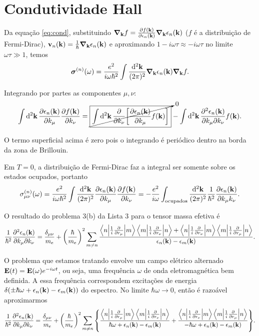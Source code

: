 \documentclass[a4paper,10pt]{article}
\begin{document}
\pagebreak

\section{Condutividade Hall}

Da equação \ref{eq:cond}, substituindo $\grad_{\vb{k}}f = \pdv{f(\vb{k})}{\epsilon_n(\vb{k})} \grad_{\vb{k}}\epsilon_n(\vb{k})$ ($f$ é a distribuição de Fermi-Dirac), $\vb{v}_n(\vb{k}) = \frac{1}{\hbar} \grad_{\vb{k}}\epsilon_n(\vb{k})$ e aproximando $1-i\omega\tau \approx -i\omega\tau$ no limite $\omega\tau \gg 1$, temos
$$
\bm{\sigma}^{(n)}(\omega) = \frac{e^2}{i\omega \hbar^2}
\int \frac{\dd[2]{\vb{k}}}{(2\pi)^2} \grad_{\vb{k}}\epsilon_n(\vb{k}) \grad_{\vb{k}} f.
$$

 Integrando por partes as componentes $\mu, \nu$:
$$
\int \dd[2]{\vb{k}} \pdv{\epsilon_n(\vb{k})}{k_\mu} \pdv{f(\vb{k})}{k_\nu} =
\cancelto{0}{\boxed{\int \dd[2]{\vb{k}} \pdv{k_\nu} \qty[\pdv{\epsilon_n(\vb{k})}{k_\mu} f(\vb{k})]}} -
\int \dd[2]{\vb{k}} \pdv{\epsilon_n(\vb{k})}{k_\mu}{k_\nu} f(\vb{k}).
$$

O termo superficial acima é zero pois o integrando é periódico dentro na borda da zona de Brillouin.

Em $T=0$, a distribuição de Fermi-Dirac faz a integral ser somente sobre os estados ocupados, portanto
$$
\sigma^{(n)}_{\mu\nu}(\omega) = \frac{e^2}{i\omega \hbar^2}
\int \frac{\dd[2]{\vb{k}}}{(2\pi)^2} \pdv{\epsilon_n(\vb{k})}{k_\mu} \pdv{f(\vb{k})}{k_\nu} =
- \frac{e^2}{i\omega}
\int_{\text{ocupados}} \frac{\dd[2]{\vb{k}}}{(2\pi)^2} \frac{1}{\hbar^2} \pdv{\epsilon_n(\vb{k})}{k_\mu k_\nu}.
$$

O resultado do problema 3(b) da Lista 3 para o tensor massa efetiva é
$$
\frac{1}{\hbar^2} \pdv{\epsilon_n(\vb{k})}{k_\mu}{k_\nu} =
\frac{\delta_{\mu\nu}}{m_e} +
\qty(\frac{\hbar}{m_e})^2
\sum_{m\neq n}
\frac{
\mel**{n}{\frac{1}{i}\pdv{r_\mu}}{m} \mel**{m}{\frac{1}{i}\pdv{r_\nu}}{n} +
\mel**{n}{\frac{1}{i}\pdv{r_\nu}}{m} \mel**{m}{\frac{1}{i}\pdv{r_\mu}}{n}
}{\epsilon_n(\vb{k}) - \epsilon_{m}(\vb{k})}.
$$

O problema que estamos tratando envolve um campo elétrico alternado $\vb{E}(t) = \vb{E}(\omega) e^{-i\omega t}$, ou seja, uma frequência $\omega$ de onda eletromagnética bem definida. A essa frequência correspondem excitações de energia $\delta(\pm \hbar \omega + \epsilon_n(\vb{k}) - \epsilon_m(\vb{k}))$ do espectro. No limite $\hbar \omega \to 0$, então é razoável aproximarmos
$$
\frac{1}{\hbar^2} \pdv{\epsilon_n(\vb{k})}{k_\mu}{k_\nu} =
\frac{\delta_{\mu\nu}}{m_e} +
\qty(\frac{\hbar}{m_e})^2
\sum_{m\neq n} \qty{
\frac{\mel**{n}{\frac{1}{i}\pdv{r_\mu}}{m} \mel**{m}{\frac{1}{i}\pdv{r_\nu}}{n}}
{\hbar \omega + \epsilon_n(\vb{k}) - \epsilon_{m}(\vb{k})} +
\frac{\mel**{n}{\frac{1}{i}\pdv{r_\nu}}{m} \mel**{m}{\frac{1}{i}\pdv{r_\mu}}{n}}
{-\hbar \omega + \epsilon_n(\vb{k}) - \epsilon_{m}(\vb{k})}
} .
$$
\end{document}
